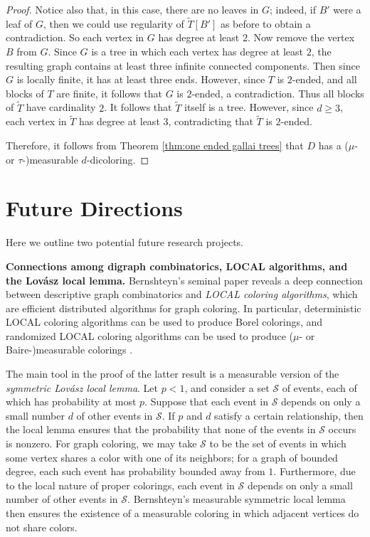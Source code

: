 \documentclass[psamsfonts]{amsart}
\theoremstyle{definition}
\theoremstyle{remark}
\numberwithin{equation}{section}
\begin{document}
\begin{proof}
    Notice also that, in this case, there are no leaves in $G$; indeed, if $B'$ were a leaf of $G$, then we could use regularity of $\tilde{T}[B']$ as before to obtain a contradiction. So each vertex in $G$ has degree at least $2$. Now remove the vertex $B$ from $G$. Since $G$ is a tree in which each vertex has degree at least $2$, the resulting graph contains at least three infinite connected components. Then since $G$ is locally finite, it has at least three ends. However, since $T$ is $2$-ended, and all blocks of $T$ are finite, it follows that $G$ is $2$-ended, a contradiction. Thus all blocks of $\tilde{T}$ have cardinality $2$. It follows that $\tilde{T}$ itself is a tree. However, since $d \geq 3$, each vertex in $\tilde{T}$ has degree at least $3$, contradicting that $\tilde{T}$ is $2$-ended.
    
    Therefore, it follows from Theorem \ref{thm:one ended gallai trees} that $D$ has a ($\mu$- or $\tau$-)measurable $d$-dicoloring.
\end{proof}

\section{Future Directions}
Here we outline two potential future research projects.

{\bf Connections among digraph combinatorics, \textsf{LOCAL} algorithms, and the Lovász local lemma.} Bernshteyn's seminal paper \cite{bernshteyn2023} reveals a deep connection between descriptive graph combinatorics and {\it \textsf{LOCAL} coloring algorithms}, which are efficient distributed algorithms for graph coloring. In particular, deterministic \textsf{LOCAL} coloring algorithms can be used to produce Borel colorings, and randomized \textsf{LOCAL} coloring algorithms can be used to produce ($\mu$- or Baire-)measurable colorings \cite{bernshteyn2023}.

The main tool in the proof of the latter result is a measurable version of the {\it symmetric Lovász local lemma}. Let $p < 1$, and consider a set $\mathcal{S}$ of events, each of which has probability at most $p$. Suppose that each event in $\mathcal{S}$ depends on only a small number $d$ of other events in $\mathcal{S}$. If $p$ and $d$ satisfy a certain relationship, then the local lemma ensures that the probability that none of the events in $\mathcal{S}$ occurs is nonzero. For graph coloring, we may take $\mathcal{S}$ to be the set of events in which some vertex shares a color with one of its neighbors; for a graph of bounded degree, each such event has probability bounded away from $1$. Furthermore, due to the local nature of proper colorings, each event in $\mathcal{S}$ depends on only a small number of other events in $\mathcal{S}$. Bernshteyn's measurable symmetric local lemma then ensures the existence of a measurable coloring in which adjacent vertices do not share colors.
\end{document}

